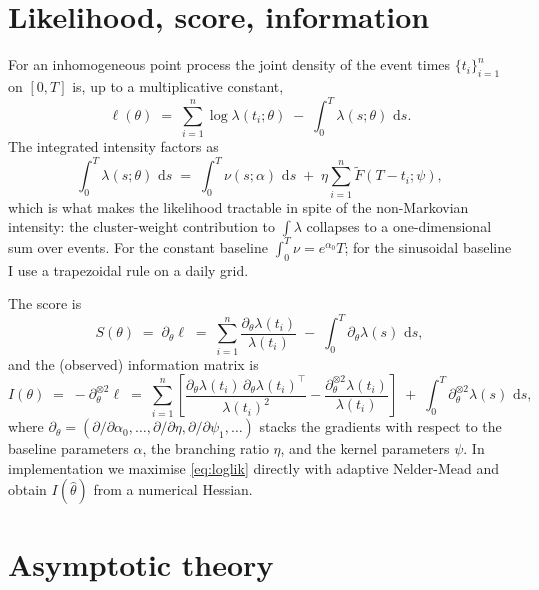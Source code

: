 \documentclass[article,shortnames,nojss]{jss}
\newcommand{\rmd}{\,\mathrm{d}}
\newcommand{\1}{\mathbbm{1}}
\theoremstyle{plain}
\theoremstyle{definition}
\begin{document}
\section{Likelihood, score, information}\label{sec:likelihood}

For an inhomogeneous point process the joint density of the event
times $\{t_i\}_{i=1}^n$ on $[0,T]$ is, up to a multiplicative
constant,
\begin{equation}\label{eq:loglik}
  \ell(\theta) \;=\; \sum_{i=1}^{n}\log \lambda(t_i;\theta)
  \;-\; \int_0^T \lambda(s;\theta)\,\rmd s.
\end{equation}
The integrated intensity factors as
\begin{equation}\label{eq:integral-decomp}
  \int_0^T \lambda(s;\theta)\,\rmd s
  \;=\; \int_0^T \nu(s;\alpha)\,\rmd s
  \;+\; \eta \sum_{i=1}^{n} \tilde F(T - t_i;\psi),
\end{equation}
which is what makes the likelihood tractable in spite of the
non-Markovian intensity: the cluster-weight contribution to
$\int\!\lambda$ collapses to a one-dimensional sum over events.
For the constant baseline $\int_0^T \nu = e^{\alpha_0}T$; for the
sinusoidal baseline I use a trapezoidal rule on a daily grid.

The score is
\begin{equation}\label{eq:score}
  S(\theta) \;=\; \partial_\theta \ell
  \;=\; \sum_{i=1}^{n}\frac{\partial_\theta \lambda(t_i)}{\lambda(t_i)}
  \;-\; \int_0^T \partial_\theta \lambda(s)\,\rmd s,
\end{equation}
and the (observed) information matrix is
\begin{equation}\label{eq:info}
  I(\theta) \;=\; -\partial_\theta^{\otimes 2}\ell
  \;=\; \sum_{i=1}^{n}\!\left[
      \frac{\partial_\theta\lambda(t_i)\,\partial_\theta\lambda(t_i)^{\!\top}}{\lambda(t_i)^2}
      - \frac{\partial_\theta^{\otimes 2}\lambda(t_i)}{\lambda(t_i)}
    \right]
    \;+\; \int_0^T\! \partial_\theta^{\otimes 2}\lambda(s)\,\rmd s,
\end{equation}
where $\partial_\theta = (\partial/\partial\alpha_0,\dots,
\partial/\partial\eta,\partial/\partial\psi_1,\dots)$ stacks the
gradients with respect to the baseline parameters $\alpha$, the
branching ratio $\eta$, and the kernel parameters $\psi$.  In
implementation we maximise \eqref{eq:loglik} directly with
adaptive Nelder-Mead and obtain $I(\hat\theta)$ from a numerical
Hessian.

\section{Asymptotic theory}\label{sec:asymptotics}
\end{document}
